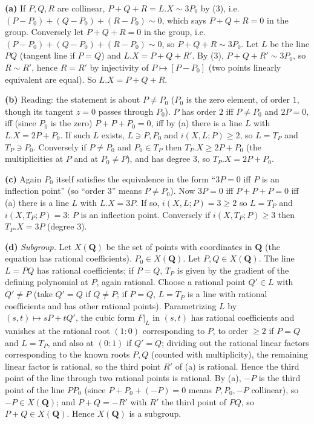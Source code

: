 \documentclass[11pt]{article}
\begin{document}
\textbf{(a)} If $P,Q,R$ are collinear, $P+Q+R=L.X\sim3P_0$ by (3), i.e.\ $(P-P_0)+(Q-P_0)+(R-P_0)\sim0$, which says $P+Q+R=0$ in the group. Conversely let $P+Q+R=0$ in the group, i.e.\ $(P-P_0)+(Q-P_0)+(R-P_0)\sim0$, so $P+Q+R\sim3P_0$. Let $L$ be the line $PQ$ (tangent line if $P=Q$) and $L.X=P+Q+R'$. By (3), $P+Q+R'\sim3P_0$, so $R\sim R'$, hence $R=R'$ by injectivity of $P\mapsto[P-P_0]$ (two points linearly equivalent are equal). So $L.X=P+Q+R$.

\textbf{(b)} Reading: the statement is about $P\ne P_0$ ($P_0$ is the zero element, of order $1$, though its tangent $z=0$ passes through $P_0$). $P$ has order $2$ iff $P\neq P_0$ and $2P=0$, iff (since $P_0$ is the zero) $P+P+P_0=0$, iff by (a) there is a line $L$ with $L.X=2P+P_0$. If such $L$ exists, $L\ni P,P_0$ and $i(X,L;P)\ge2$, so $L=T_P$ and $T_P\ni P_0$. Conversely if $P\ne P_0$ and $P_0\in T_P$ then $T_P.X\ge2P+P_0$ (the multiplicities at $P$ and at $P_0\neq P$), and has degree $3$, so $T_P.X=2P+P_0$.

\textbf{(c)} Again $P_0$ itself satisfies the equivalence in the form ``$3P=0$ iff $P$ is an inflection point'' (so ``order $3$'' means $P\ne P_0$). Now $3P=0$ iff $P+P+P=0$ iff (a) there is a line $L$ with $L.X=3P$. If so, $i(X,L;P)=3\ge2$ so $L=T_P$ and $i(X,T_P;P)=3$: $P$ is an inflection point. Conversely if $i(X,T_P;P)\ge3$ then $T_P.X=3P$ (degree $3$).

\textbf{(d)} \emph{Subgroup.} Let $X(\mathbf Q)$ be the set of points with coordinates in $\mathbf Q$ (the equation has rational coefficients). $P_0\in X(\mathbf Q)$. Let $P,Q\in X(\mathbf Q)$. The line $L=PQ$ has rational coefficients; if $P=Q$, $T_P$ is given by the gradient of the defining polynomial at $P$, again rational. Choose a rational point $Q'\in L$ with $Q'\ne P$ (take $Q'=Q$ if $Q\ne P$; if $P=Q$, $L=T_P$ is a line with rational coefficients and has other rational points). Parametrizing $L$ by $(s,t)\mapsto sP+tQ'$, the cubic form $F|_L$ in $(s,t)$ has rational coefficients and vanishes at the rational root $(1:0)$ corresponding to $P$, to order $\ge2$ if $P=Q$ and $L=T_P$, and also at $(0:1)$ if $Q'=Q$; dividing out the rational linear factors corresponding to the known roots $P,Q$ (counted with multiplicity), the remaining linear factor is rational, so the third point $R'$ of (a) is rational. Hence the third point of the line through two rational points is rational. By (a), $-P$ is the third point of the line $PP_0$ (since $P+P_0+(-P)=0$ means $P,P_0,-P$ collinear), so $-P\in X(\mathbf Q)$; and $P+Q=-R'$ with $R'$ the third point of $PQ$, so $P+Q\in X(\mathbf Q)$. Hence $X(\mathbf Q)$ is a subgroup.
\end{document}
